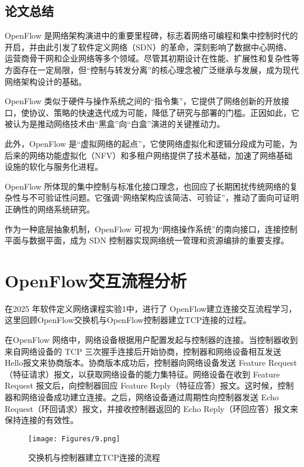 \documentclass{article}
\begin{document}
\subsection{\textbf{论文总结}}

\quad\quad OpenFlow 是网络架构演进中的重要里程碑，标志着网络可编程和集中控制时代的开启，并由此引发了软件定义网络（SDN）的革命，深刻影响了数据中心网络、运营商骨干网和企业网络等多个领域。尽管其初期设计在性能、扩展性和复杂性等方面存在一定局限，但“控制与转发分离”的核心理念被广泛继承与发展，成为现代网络架构设计的基础。

OpenFlow 类似于硬件与操作系统之间的“指令集”\cite{shankland2012openflow}，它提供了网络创新的开放接口，使协议、策略的快速迭代成为可能，降低了研究与部署的门槛。正因如此，它被认为是推动网络技术由“黑盒”向“白盒”演进的关键推动力。

此外，OpenFlow 是“虚拟网络的起点”\cite{metz2012nicira}，它使网络虚拟化和逻辑分段成为可能，为后来的网络功能虚拟化（NFV）和多租户网络提供了技术基础，加速了网络基础设施的软化与服务化进程。

OpenFlow 所体现的集中控制与标准化接口理念，也回应了长期困扰传统网络的复杂性与不可验证性问题。它强调“网络架构应该简洁、可验证”，推动了面向可证明正确性的网络系统研究。

作为一种底层抽象机制，OpenFlow 可视为“网络操作系统”的南向接口，连接控制平面与数据平面，成为 SDN 控制器实现网络统一管理和资源编排的重要支撑。


\section{OpenFlow交互流程分析}
\quad\quad 在2025 年软件定义网络课程实验1中，进行了 OpenFlow建立连接交互流程学习，这里回顾OpenFlow交换机与OpenFlow控制器建立TCP连接的过程。

在OpenFlow 网络中，网络设备根据用户配置发起与控制器的连接。当控制器收到来自网络设备的 TCP 三次握手连接后开始协商，控制器和网络设备相互发送 Hello报文来协商版本。协商版本成功后，控制器向网络设备发送 Feature Request（特征请求）报文，以获取网络设备的能力集特征。网络设备在收到 Feature Request 报文后，向控制器回应 Feature Reply（特征应答）报文。这时候，控制器和网络设备成功建立连接。之后，网络设备通过周期性向控制器发送 Echo Request（环回请求）报文，并接收控制器返回的 Echo Reply（环回应答）报文来保持连接的有效性。

\begin{figure}[h]
    \centering
    \texttt{[image: Figures/9.png]}
    \caption{交换机与控制器建立TCP连接的流程}
\end{figure}
\end{document}

